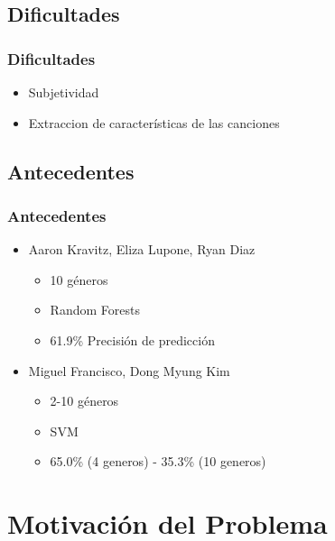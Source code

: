 \documentclass{beamer}
\begin{document}
\subsection{Dificultades} %

\begin{frame}
\frametitle{Dificultades}
\begin{itemize}
\item Subjetividad
\item Extraccion de caracter\'{i}sticas de las canciones
\end{itemize}
\end{frame}

\subsection{Antecedentes} %

\begin{frame}
\frametitle{Antecedentes}
\begin{itemize}
\item Aaron Kravitz, Eliza Lupone, Ryan Diaz
    \begin{itemize}
    \item 10 g\'{e}neros 
    \item Random Forests 
    \item 61.9\% Precisi\'{o}n de predicci\'{o}n 
    \end{itemize} 
\item Miguel Francisco, Dong Myung Kim
    \begin{itemize}
    \item 2-10 g\'{e}neros
    \item SVM
    \item 65.0\% (4 generos) - 35.3\% (10 generos) 
    \end{itemize}
\end{itemize}
\end{frame}


\section{Motivaci\'{o}n del Problema} %
\end{document}
